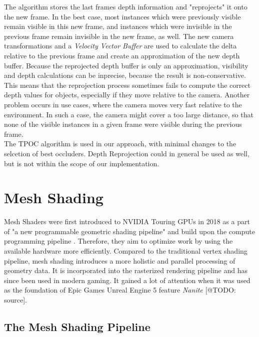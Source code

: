 \noindent
The algorithm stores the last frames depth information and "reprojects" it onto the new frame. In the best case, 
most instances which were previously visible remain visible in this new frame, and instances which were invisible 
in the previous frame remain invisible in the new frame, as well. The new camera transformations and a 
\emph{Velocity Vector Buffer} are used to calculate the delta relative to the previous frame and create an 
approximation of the new depth buffer. Because the reprojected depth buffer is only an approximation, visibility 
and depth calculations can be inprecise, because the result is non-conservative. This means that the reprojection 
process sometimes fails to compute the correct depth values for objects, especially if they move relative to the 
camera. Another problem occurs in use cases, where the camera moves very fast relative to the environment. In such 
a case, the camera might cover a too large distance, so that none of the visible instances in a given frame were 
visible during the previous frame. \cite{Kruskonja2022} \\

\noindent
The \ac{TPOC} algorithm is used in our approach, with minimal changes to the selcetion of best occluders.
Depth Reprojection could in general be used as well, but is not within the scope of our implementation.

\section{Mesh Shading}  \label{sec-mesh-shading}

Mesh Shaders were first introduced to NVIDIA Touring \ac{GPU}s in 2018 as a part of
"a new programmable geometric shading pipeline" and build upon the compute programming 
pipeline \cite{Kubisch2018}. Therefore, they aim to optimize work by 
using the available hardware more efficiently. Compared to the traditional vertex shading 
pipeline, mesh shading introduces a more holistic and parallel processing of geometry data.
It is incorporated into the rasterized rendering pipeline and has since been used in modern 
gaming. It gained a lot of attention when it was used as the foundation of Epic Games 
Unreal Engine 5 feature \emph{Nanite} [@TODO: source].\\

\subsection{The Mesh Shading Pipeline} \label{subsec-the-mesh-shading-pipeline}


